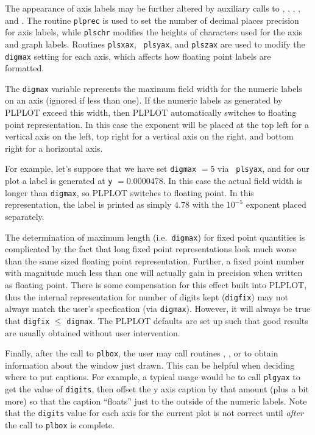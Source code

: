 The appearance of axis labels may be further altered by auxiliary calls to
, , , , and .
The routine {\tt plprec} is used to set the number of decimal places
precision for axis labels, while {\tt plschr} modifies the heights of
characters used for the axis and graph labels.  Routines {\tt plsxax}, {\tt
plsyax}, and {\tt plszax} are used to modify the {\tt digmax} setting for
each axis, which affects how floating point labels are formatted.

The {\tt digmax} variable represents the maximum field width for the
numeric labels on an axis (ignored if less than one).  If the numeric
labels as generated by PLPLOT exceed this width, then PLPLOT automatically
switches to floating point representation.  In this case the exponent will
be placed at the top left for a vertical axis on the left, top right for
a vertical axis on the right, and bottom right for a horizontal axis. 

For example, let's suppose that we have set {\tt digmax} $ = 5$ via {\tt
plsyax}, and for our plot a label is generated at {\tt y} $ = 0.0000478$.  In
this case the actual field width is longer than {\tt digmax}, so PLPLOT
switches to floating point.  In this representation, the label is printed as
simply $4.78$ with the $10^{-5}$ exponent placed separately.

The determination of maximum length (i.e.~{\tt digmax}) for fixed point
quantities is complicated by the fact that long fixed point representations
look much worse than the same sized floating point representation.
Further, a fixed point number with magnitude much less than one will
actually gain in precision when written as floating point.  There is some
compensation for this effect built into PLPLOT, thus the internal
representation for number of digits kept ({\tt digfix}) may not always
match the user's specfication (via {\tt digmax}).  However, it will always
be true that {\tt digfix} $\le$ {\tt digmax}.  The PLPLOT defaults are
set up such that good results are usually obtained without user
intervention. 

Finally, after the call to {\tt plbox}, the user may call routines
, , or  to obtain information about the
window just drawn.  This can be helpful when deciding where to put
captions.  For example, a typical usage would be to call {\tt plgyax} to
get the value of {\tt digits}, then offset the y axis caption by that amount
(plus a bit more) so that the caption ``floats'' just to the outside of the
numeric labels.  Note that the {\tt digits} value for each axis for the
current plot is not correct until {\em after\/} the call to {\tt plbox} is
complete. 

